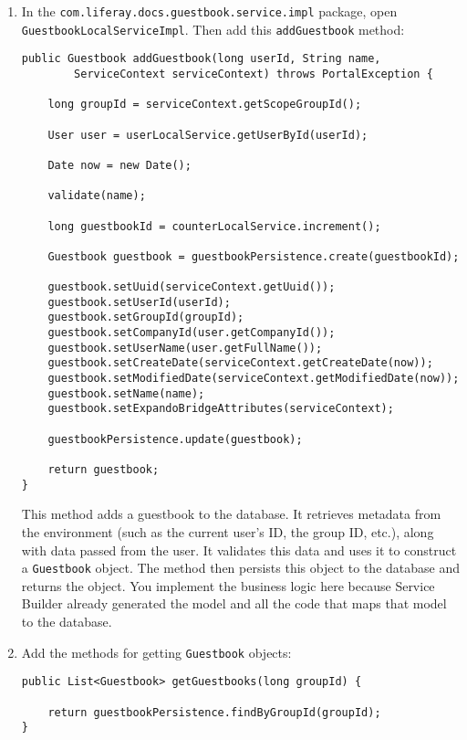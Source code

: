 \begin{enumerate}
\def\labelenumi{\arabic{enumi}.}
\item
  In the \texttt{com.liferay.docs.guestbook.service.impl} package, open
  \texttt{GuestbookLocalServiceImpl}. Then add this
  \texttt{addGuestbook} method:

\begin{verbatim}
public Guestbook addGuestbook(long userId, String name,
        ServiceContext serviceContext) throws PortalException {

    long groupId = serviceContext.getScopeGroupId();

    User user = userLocalService.getUserById(userId);

    Date now = new Date();

    validate(name);

    long guestbookId = counterLocalService.increment();

    Guestbook guestbook = guestbookPersistence.create(guestbookId);

    guestbook.setUuid(serviceContext.getUuid());
    guestbook.setUserId(userId);
    guestbook.setGroupId(groupId);
    guestbook.setCompanyId(user.getCompanyId());
    guestbook.setUserName(user.getFullName());
    guestbook.setCreateDate(serviceContext.getCreateDate(now));
    guestbook.setModifiedDate(serviceContext.getModifiedDate(now));
    guestbook.setName(name);
    guestbook.setExpandoBridgeAttributes(serviceContext);

    guestbookPersistence.update(guestbook);

    return guestbook;
}
\end{verbatim}

  This method adds a guestbook to the database. It retrieves metadata
  from the environment (such as the current user's ID, the group ID,
  etc.), along with data passed from the user. It validates this data
  and uses it to construct a \texttt{Guestbook} object. The method then
  persists this object to the database and returns the object. You
  implement the business logic here because Service Builder already
  generated the model and all the code that maps that model to the
  database.
\item
  Add the methods for getting \texttt{Guestbook} objects:

\begin{verbatim}
public List<Guestbook> getGuestbooks(long groupId) {

    return guestbookPersistence.findByGroupId(groupId);
}


\end{verbatim}
\end{enumerate}
